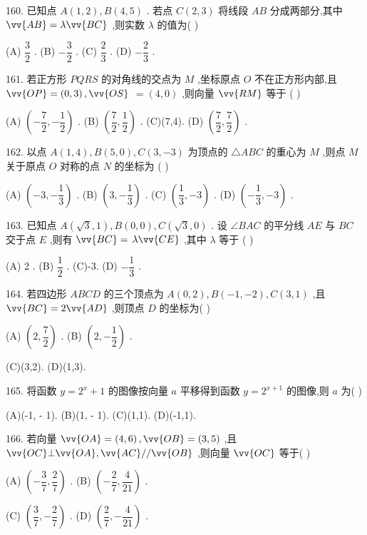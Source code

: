 160. 已知点 $A\left( {1,2}\right) ,B\left( {4,5}\right)$ . 若点 $C\left( {2,3}\right)$ 将线段 ${AB}$ 分成两部分,其中 $\vv{AB} = \lambda \vv{BC}$ ,则实数 $\lambda$ 的值为(   )

(A) $\dfrac{3}{2}$ . (B) $- \dfrac{3}{2}$ . (C) $\dfrac{2}{3}$ . (D) $- \dfrac{2}{3}$ .

161. 若正方形 ${PQRS}$ 的对角线的交点为 $M$ ,坐标原点 $O$ 不在正方形内部,且 $\vv{OP} = \left( {0,3}\right) ,\vv{OS}$  $= \left( {4,0}\right)$ ,则向量 $\vv{RM}$ 等于 (   )

(A) $\left( {-\dfrac{7}{2}, - \dfrac{1}{2}}\right)$ . (B) $\left( {\dfrac{7}{2},\dfrac{1}{2}}\right)$ . (C)(7,4). (D) $\left( {\dfrac{7}{2},\dfrac{7}{2}}\right)$ .

162. 以点 $A\left( {1,4}\right) ,B\left( {5,0}\right) ,C\left( {3, - 3}\right)$ 为顶点的 $\bigtriangleup {ABC}$ 的重心为 $M$ ,则点 $M$ 关于原点 $O$ 对称的点 $N$ 的坐标为 (   )

(A) $\left( {-3, - \dfrac{1}{3}}\right)$ . (B) $\left( {3, - \dfrac{1}{3}}\right)$ . (C) $\left( {\dfrac{1}{3}, - 3}\right)$ . (D) $\left( {-\dfrac{1}{3}, - 3}\right)$ .

163. 已知点 $A\left( {\sqrt{3},1}\right) ,B\left( {0,0}\right) ,C\left( {\sqrt{3},0}\right)$ . 设 $\angle {BAC}$ 的平分线 ${AE}$ 与 ${BC}$ 交于点 $E$ ,则有 $\vv{BC} =$  $\lambda \vv{CE}$ ,其中 $\lambda$ 等于 (   )

(A) 2 . (B) $\dfrac{1}{2}$ . (C)-3. (D) $- \dfrac{1}{3}$ .

164. 若四边形 ${ABCD}$ 的三个顶点为 $A\left( {0,2}\right) ,B\left( {-1, - 2}\right) ,C\left( {3,1}\right)$ ,且 $\vv{BC} = 2\vv{AD}$ ,则顶点 $D$ 的坐标为(   )

(A) $\left( {2,\dfrac{7}{2}}\right)$ . (B) $\left( {2, - \dfrac{1}{2}}\right)$ .

(C)(3,2). (D)(1,3).

165. 将函数 $y = {2}^{x} + 1$ 的图像按向量 $a$ 平移得到函数 $y = {2}^{x + 1}$ 的图像,则 $a$ 为(   )

(A)(-1, - 1). (B)(1, - 1). (C)(1,1). (D)(-1,1).

166. 若向量 $\vv{OA} = \left( {4,6}\right) ,\vv{OB} = \left( {3,5}\right)$ ,且 $\vv{OC}\bot \vv{OA},\vv{AC}//\vv{OB}$ ,则向量 $\vv{OC}$ 等于(   )

(A) $\left( {-\dfrac{3}{7},\dfrac{2}{7}}\right)$ . (B) $\left( {-\dfrac{2}{7},\dfrac{4}{21}}\right)$ .

(C) $\left( {\dfrac{3}{7}, - \dfrac{2}{7}}\right)$ . (D) $\left( {\dfrac{2}{7}, - \dfrac{4}{21}}\right)$ .

